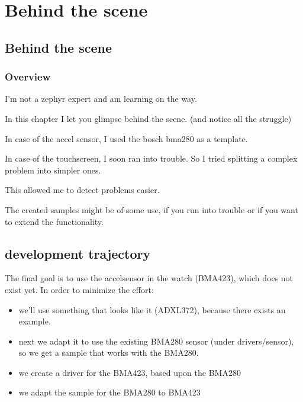 \documentclass[letterpaper,10pt,english]{sphinxmanual}
\begin{document}
\chapter{Behind the scene}
\label{\detokenize{behind/behind:behind-the-scene}}\label{\detokenize{behind/behind:id1}}\label{\detokenize{behind/behind::doc}}

\section{Behind the scene}
\label{\detokenize{behind/behind-the-scene:behind-the-scene}}\label{\detokenize{behind/behind-the-scene::doc}}

\subsection{Overview}
\label{\detokenize{behind/behind-the-scene:overview}}
I’m not a zephyr expert and am learning on the way.

In this chapter I let you glimpse behind the scene. (and notice all the struggle)

In case of the accel sensor, I used the bosch bma280 as a template.

In case of the touchscreen, I soon ran into trouble.
So I tried splitting a complex problem into simpler ones.

This allowed me to detect problems easier.

The created samples might be of some use, if you run into trouble or if you want to extend the functionality.


\section{development trajectory}
\label{\detokenize{behind/bma280:development-trajectory}}\label{\detokenize{behind/bma280::doc}}
The final goal is to use the accel\sphinxhyphen{}sensor in the watch (BMA423), which does not exist yet.
In order to minimize the effort:
\begin{itemize}
\item {} 
we’ll use something that looks like it (ADXL372), because there exists an example.

\item {} 
next we adapt it to use the existing BMA280 sensor (under drivers/sensor), so we get a sample that works with the BMA280.

\item {} 
we create a driver for the BMA423, based upon the BMA280

\item {} 
we adapt the sample for the BMA280 to BMA423

\end{itemize}
\end{document}
